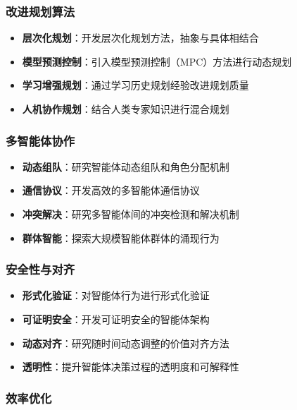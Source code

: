 \subsubsection{改进规划算法}

\begin{itemize}[leftmargin=2em]
    \item \textbf{层次化规划}：开发层次化规划方法，抽象与具体相结合
    \item \textbf{模型预测控制}：引入模型预测控制（MPC）方法进行动态规划
    \item \textbf{学习增强规划}：通过学习历史规划经验改进规划质量
    \item \textbf{人机协作规划}：结合人类专家知识进行混合规划
\end{itemize}

\subsubsection{多智能体协作}

\begin{itemize}[leftmargin=2em]
    \item \textbf{动态组队}：研究智能体动态组队和角色分配机制
    \item \textbf{通信协议}：开发高效的多智能体通信协议
    \item \textbf{冲突解决}：研究多智能体间的冲突检测和解决机制
    \item \textbf{群体智能}：探索大规模智能体群体的涌现行为
\end{itemize}

\subsubsection{安全性与对齐}

\begin{itemize}[leftmargin=2em]
    \item \textbf{形式化验证}：对智能体行为进行形式化验证
    \item \textbf{可证明安全}：开发可证明安全的智能体架构
    \item \textbf{动态对齐}：研究随时间动态调整的价值对齐方法
    \item \textbf{透明性}：提升智能体决策过程的透明度和可解释性
\end{itemize}

\subsubsection{效率优化}

